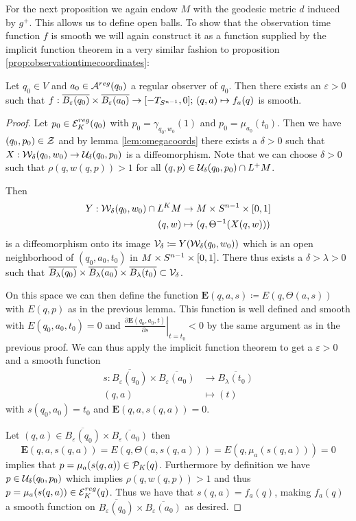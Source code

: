 For the next proposition we again endow $M$ with the geodesic metric $d$ induced by $g^+$. This allows us to define open balls. To show that the observation time function $f$ is smooth we will again construct it as a function supplied by
the implicit function theorem in a very similar fashion to proposition \ref{prop:observationtimecoordinates}:
\begin{proposition}\label{prop:fsmooth}
    Let $q_0\in V$ and $a_0\in {{\mathcal{A}}^{reg}}(q_0)$ a regular observer of $q_0$. Then there exists an $\varepsilon>0$ such that $f:\overline{B_\varepsilon(q_0)}\times \overline{B_\varepsilon(a_0)} \to [-T_{S^{n-1}},0]; \, (q,a)\mapsto f_a(q)$ is smooth.
\end{proposition}
\begin{proof}
    Let $p_0 \in {{\mathcal{E}}^{reg}_K}(q_0)$ with $p_0 = \gamma_{q_0,w_0}(1)$ and $p_0 = \mu_{a_0}(t_0)$. Then we have $(q_0,p_0)\in {\mathcal{Z}}$ and by lemma \ref{lem:omegacoords} there exists a $\delta>0$ such that $X:{\mathcal{W}}_\delta(q_0,w_0)\to {\mathcal{U}}_\delta(q_0,p_0)$ is a diffeomorphism. Note that we can choose $\delta>0$ such that $\rho(q,w(q,p))>1$ for all $(q,p)\in {\mathcal{U}}_\delta(q_0,p_0) \cap L^+M$.

    Then 
    \begin{align*}
        Y:{\mathcal{W}}_\delta(q_0,w_0) \cap L^KM&\to M\times {S^{n-1}} \times [0,1]\\
        (q,w) &\mapsto (q,\Theta^{-1}(X(q,w)))
    \end{align*} 
    is a diffeomorphism onto its image ${\mathcal{V}}_\delta\coloneqq Y({\mathcal{W}}_\delta(q_0,w_0))$  which is an open neighborhood of $(q_0,a_0,t_0)$ in $M\times {S^{n-1}} \times [0,1]$. There thus exists a $\delta > \lambda>0$ such that $\overline{B_\lambda(q_0)}\times\overline{B_\lambda(a_0)} \times\overline{B_\lambda(t_0)} \subset {\mathcal{V}}_\delta$.

    On this space we can then define the function $\mathbf{E}(q,a,s)\coloneqq E(q,\Theta(a,s))$ with $E(q,p)$ as in the previous lemma. This function is well defined and smooth with $E(q_0,a_0,t_0)=0$ and $\left.\frac{\partial\mathbf{E}(q_0,a_0,t)}{\partial s}\right\rvert_{t=t_0} < 0$ by the same argument as in the previous proof. We can thus apply the implicit function theorem to get a $\varepsilon>0$ and a smooth function 
    \begin{align*}
        s:\overline{B_\varepsilon(q_0)}\times\overline{B_\varepsilon(a_0)} &\to \overline{B_\lambda(t_0)}\\
        (q,a)&\mapsto (t)
    \end{align*} with $s(q_0,a_0)=t_0$ and $\mathbf{E}(q,a,s(q,a))=0$.

    Let $(q,a) \in \overline{B_\varepsilon(q_0)}\times\overline{B_\varepsilon(a_0)}$ then 
    \[
        \mathbf{E}(q,a,s(q,a))=E(q,\Theta(a,s(q,a))) = E(q,\mu_a(s(q,a))) = 0
    \] 
    implies that $p=\mu_a(s(q,a))\in {\mathcal{P}}_K(q)$. Furthermore by definition we have $p\in {\mathcal{U}}_\delta(q_0,p_0)$ which implies $\rho(q,w(q,p))>1$ and thus $p=\mu_a(s(q,a))\in {{\mathcal{E}}^{reg}_K}(q)$. Thus we have that $s(q,a)=f_a(q)$, making $f_a(q)$ a smooth function on $\overline{B_\varepsilon(q_0)}\times\overline{B_\varepsilon(a_0)}$ as desired.
\end{proof} 
